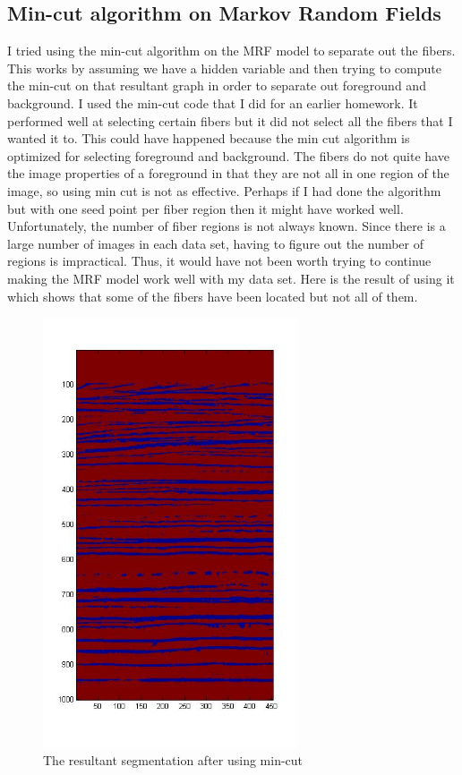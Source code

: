 \documentclass[11pt,psfig]{article}
\begin{document}
\subsection{Min-cut algorithm on Markov Random Fields}
I tried using the min-cut algorithm on the MRF model to separate out the fibers. This works by assuming we have a hidden variable and then trying to compute the min-cut on that resultant graph in order to separate out foreground and background. I used the min-cut code that I did for an earlier homework. It performed well at selecting certain fibers but it did not select all the fibers that I wanted it to. This could have happened because the min cut algorithm is optimized for selecting foreground and background. The fibers do not quite have the image properties of a foreground in that they are not all in one region of the image, so using min cut is not as effective. Perhaps if I had done the algorithm but with one seed point per fiber region then it might have worked well. Unfortunately, the number of fiber regions is not always known. Since there is a large number of images in each data set, having to figure out the number of regions is impractical. Thus, it would have not been worth trying to continue making the MRF model work well with my data set. Here is the result of using it which shows that some of the fibers have been located but not all of them. \\
\begin{figure}[H]
\centering
\includegraphics[height=5in]{minCutResult.jpg}
\caption{The resultant segmentation after using min-cut}
\end{figure}
\end{document}
